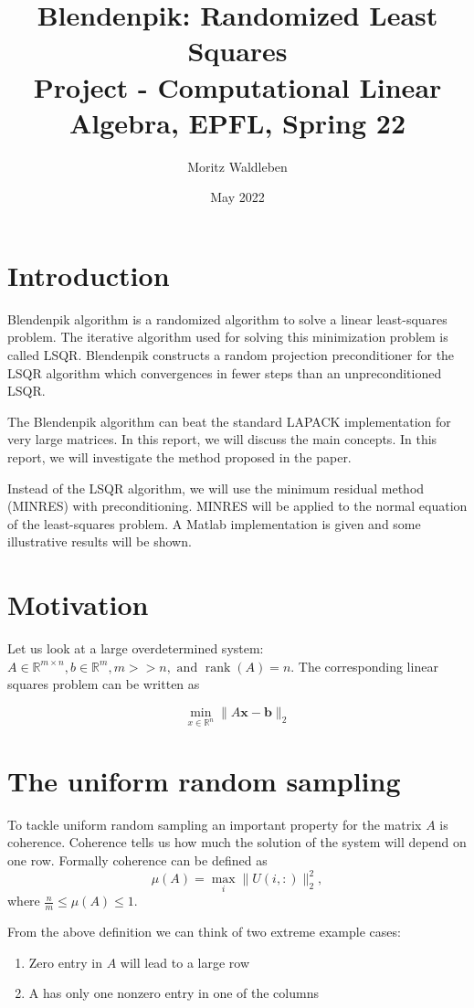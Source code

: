 \documentclass{article}
\title{Blendenpik: Randomized Least Squares \\[1ex] \large Project - Computational Linear Algebra, EPFL, Spring 22}
\author{Moritz Waldleben}
\date{May 2022}
\begin{document}
\maketitle

\section{Introduction}
Blendenpik algorithm \cite{blendenpik} is a randomized algorithm to solve a
linear least-squares problem. The iterative algorithm used for solving this minimization
problem is called LSQR. Blendenpik constructs a random projection preconditioner
for the LSQR algorithm which convergences in fewer steps than an
unpreconditioned LSQR.  

The Blendenpik algorithm can beat the standard LAPACK implementation for very
large matrices. In this report, we will discuss the main concepts. In this report,
we will investigate the method proposed in the paper.

Instead of the LSQR
algorithm, we will use the minimum residual method (MINRES) with preconditioning.
MINRES will be applied to the normal equation of the least-squares problem. A
Matlab implementation is given and some illustrative results will be shown.

\section{Motivation}
Let us look at a large overdetermined system: $A \in \mathbb{R}^{m \times n}, b \in \mathbb{R}^{m}, m>>n, \text { and } \operatorname{rank}(A)=n$. The corresponding linear squares problem can be written as

$$\min _{x \in \mathbb{R}^{n}}\|A \mathbf{x}-\mathbf{b}\|_{2}$$

\section{The uniform random sampling}
To tackle uniform random sampling an important property for the matrix $A$ is coherence. Coherence tells us how much the solution of the system will depend on one row.
Formally coherence can be defined as
$$
\mu(A)=\max _{i}\|U(i,:)\|_{2}^{2},
$$
where $\frac{n}{m} \le \mu(A) \le 1$. 

From the above definition we can think of two extreme example cases:

\begin{enumerate}
\item
Zero entry in $A$ will lead to a large row
\item
A has only one nonzero entry in one of the columns
\end{enumerate}
\end{document}
